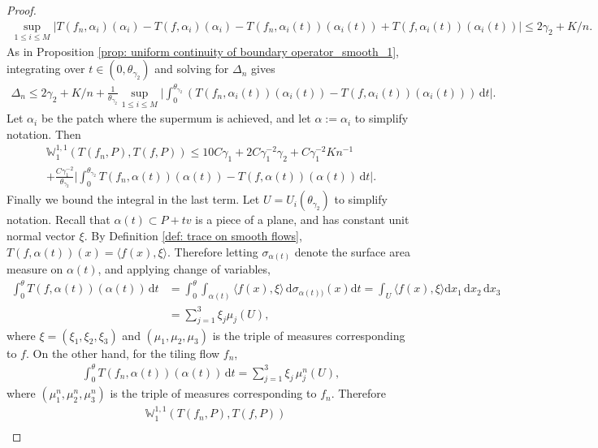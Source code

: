 \documentclass[11pt]{article}
\theoremstyle{remark}
\theoremstyle{definition}
\newcommand{\m}[1]{\mathbb{#1}}
\newcommand{\dd}{\mathrm{d}}
\begin{document}
\begin{proof}
\begin{align*}
    \sup_{1\leq i\leq M} \bigg| T(f_n,\alpha_i)(\alpha_i) - T(f,\alpha_i)(\alpha_i) - T(f_n,\alpha_i(t))(\alpha_i(t)) + T(f,\alpha_i(t))(\alpha_i(t))\bigg|\leq 2\gamma_2 + K/n.
\end{align*}
As in Proposition \ref{prop: uniform continuity of boundary operator_smooth_1}, integrating over $t\in(0,\theta_{\gamma_2})$ and solving for $\Delta_n$ gives 
\begin{align*}
    \Delta_n \leq 2 \gamma_2 + K/n + \frac{1}{\theta_{\gamma_2}} \sup_{1\leq i \leq M}\bigg|\int_{0}^{\theta_{\gamma_2}} (T(f_n,\alpha_i(t))(\alpha_i(t))- T(f,\alpha_i(t))(\alpha_i(t)))\, \dd t \bigg| .
\end{align*}
Let $\alpha_i$ be the patch where the supermum is achieved, and let $\alpha:=\alpha_i$ to simplify notation. Then \begin{align*}
    \m W_1^{1,1}(T(f_n,P),T(f,P)) \leq 10 C \gamma_1 + 2 C \gamma_1^{-2}\gamma_2 +  C \gamma_1^{-2} K n^{-1} \\ +  \frac{C \gamma_1^{-2}}{\theta_{\gamma_2}} \bigg|\int_{0}^{\theta_{\gamma_2}} T(f_n,\alpha(t))(\alpha(t))- T(f,\alpha(t))(\alpha(t))\, \dd t \bigg|.
\end{align*}
Finally we bound the integral in the last term. Let $U = U_i(\theta_{\gamma_2})$ to simplify notation. Recall that $\alpha(t) \subset P + t v$ is a piece of a plane, and has constant unit normal vector $\xi$. By Definition \ref{def: trace on smooth flows}, $T(f,\alpha(t))(x) = \langle f(x), \xi\rangle$. Therefore letting $\sigma_{\alpha(t)}$ denote the surface area measure on $\alpha(t)$, and applying change of variables, 
\begin{align*}
    \int_0^\theta T(f,\alpha(t))(\alpha(t)) \, \dd t &= \int_0^\theta \int_{\alpha(t)} \langle f(x),\xi\rangle \, \dd \sigma_{\alpha(t))}(x) \dd t = \int_U \langle f(x), \xi\rangle \dd x_1\, \dd x_2\, \dd x_3 \\
    &= \sum_{j=1}^3 \xi_j \mu_{j}(U),
\end{align*}
where $\xi = (\xi_1,\xi_2,\xi_3)$ and $(\mu_1,\mu_2,\mu_3)$ is the triple of measures corresponding to $f$. On the other hand, for the tiling flow $f_n$,
\begin{align*}
    \int_0^\theta T(f_n,\alpha(t))(\alpha(t)) \, \dd t = \sum_{j=1}^3 \xi_j \, \mu_j^n(U),
\end{align*}
where $(\mu_1^n,\mu_2^n,\mu_3^n)$ is the triple of measures corresponding to $f_n$. Therefore 
\begin{align*}
    &\m W_1^{1,1}(T(f_n,P),T(f,P)) \\

\end{align*}
\end{proof}
\end{document}
